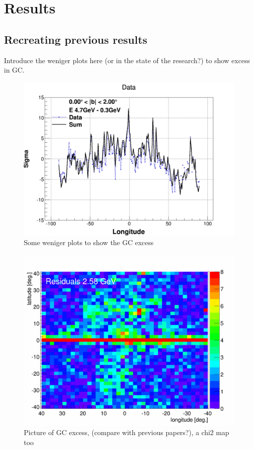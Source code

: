 \chapter{Results}
\label{ch:results}
%

\section{Recreating previous results}

Introduce the weniger plots here (or in the state of the research?) to show excess in GC.
\begin{figure}[h]
  \centering
  \includegraphics[width=.9\linewidth]{pic/results/Weniger_SUM_b0-2_E4.7-0.31GeV.png}
  \caption{Some weniger plots to show the GC excess}
  \label{fig:weniger_plot}
\end{figure}



\begin{figure}[h]
  \centering
  \includegraphics[width=.9\linewidth]{pic/results/BKGonly_halo_residuals.png}
  \caption{Picture of GC excess, (compare with previous papers?), a chi2 map too}
  \label{fig:original_GC_excess}
\end{figure}

